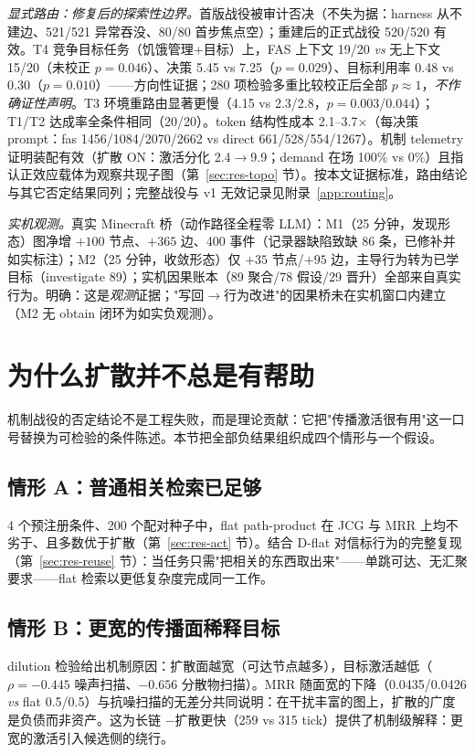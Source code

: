 \documentclass[10pt,a4paper]{ctexart}
\begin{document}
\emph{显式路由：修复后的探索性边界。}首版战役被审计否决（不失为据：harness 从不建边、521/521 异常吞没、80/80 首步焦点空）；重建后的正式战役 520/520 有效。T4 竞争目标任务（饥饿管理+目标）上，FAS 上下文 19/20 \emph{vs} 无上下文 15/20（未校正 $p{=}0.046$）、决策 5.45 vs 7.25（$p{=}0.029$）、目标利用率 0.48 vs 0.30（$p{=}0.010$）——方向性证据；280 项检验多重比较校正后全部 $p{\approx}1$，\emph{不作确证性声明}。T3 环境重路由显著更慢（4.15 vs 2.3/2.8，$p{=}0.003$/$0.044$）；T1/T2 达成率全条件相同（20/20）。token 结构性成本 2.1--3.7$\times$（每决策 prompt：fas 1456/1084/2070/2662 vs direct 661/528/554/1267）。机制 telemetry 证明装配有效（扩散 ON：激活分化 2.4$\rightarrow$9.9；demand 在场 100\% vs 0\%）且指认正效应载体为观察共现子图（第~\ref{sec:res-topo} 节）。按本文证据标准，路由结论与其它否定结果同列；完整战役与 v1 无效记录见附录~\ref{app:routing}。

\emph{实机观测。}真实 Minecraft 桥（动作路径全程零 LLM）：M1（25 分钟，发现形态）图净增 $+100$ 节点、$+365$ 边、400 事件（记录器缺陷致缺 86 条，已修补并如实标注）；M2（25 分钟，收敛形态）仅 $+35$ 节点/$+95$ 边，主导行为转为已学目标（investigate 89）；实机因果账本（89 聚合/78 假设/29 晋升）全部来自真实行为。明确：这是\emph{观测}证据；"写回$\rightarrow$行为改进"的因果桥未在实机窗口内建立（M2 无 obtain 闭环为如实负观测）。

\section{为什么扩散并不总是有帮助}
\label{sec:whydiff}

机制战役的否定结论不是工程失败，而是理论贡献：它把"传播激活很有用"这一口号替换为可检验的条件陈述。本节把全部负结果组织成四个情形与一个假设。

\subsection{情形 A：普通相关检索已足够}
4 个预注册条件、200 个配对种子中，flat path-product 在 JCG 与 MRR 上均不劣于、且多数优于扩散（第~\ref{sec:res-act} 节）。结合 D-flat 对信标行为的完整复现（第~\ref{sec:res-reuse} 节）：当任务只需"把相关的东西取出来"——单跳可达、无汇聚要求——flat 检索以更低复杂度完成同一工作。

\subsection{情形 B：更宽的传播面稀释目标}
dilution 检验给出机制原因：扩散面越宽（可达节点越多），目标激活越低（$\rho{=}{-}0.445$ 噪声扫描、${-}0.656$ 分散物扫描）。MRR 随面宽的下降（0.0435/0.0426 \emph{vs} flat 0.5/0.5）与抗噪扫描的无差分共同说明：在干扰丰富的图上，扩散的广度是负债而非资产。这为长链 $-$扩散更快（259 vs 315 tick）提供了机制级解释：更宽的激活引入候选侧的绕行。
\end{document}
